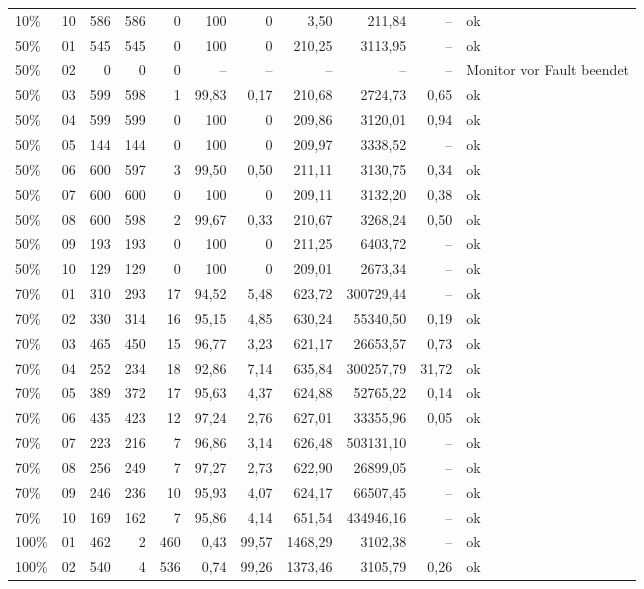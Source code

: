 \begin{longtable}{llrrrrrrrrl}
10\% & 10 & 586 & 586 & 0 & 100 & 0 & 3,50 & 211,84 & -- & ok \\
50\% & 01 & 545 & 545 & 0 & 100 & 0 & 210,25 & 3113,95 & -- & ok \\
50\% & 02 & 0 & 0 & 0 & -- & -- & -- & -- & -- & Monitor vor Fault beendet \\
50\% & 03 & 599 & 598 & 1 & 99,83 & 0,17 & 210,68 & 2724,73 & 0,65 & ok \\
50\% & 04 & 599 & 599 & 0 & 100 & 0 & 209,86 & 3120,01 & 0,94 & ok \\
50\% & 05 & 144 & 144 & 0 & 100 & 0 & 209,97 & 3338,52 & -- & ok \\
50\% & 06 & 600 & 597 & 3 & 99,50 & 0,50 & 211,11 & 3130,75 & 0,34 & ok \\
50\% & 07 & 600 & 600 & 0 & 100 & 0 & 209,11 & 3132,20 & 0,38 & ok \\
50\% & 08 & 600 & 598 & 2 & 99,67 & 0,33 & 210,67 & 3268,24 & 0,50 & ok \\
50\% & 09 & 193 & 193 & 0 & 100 & 0 & 211,25 & 6403,72 & -- & ok \\
50\% & 10 & 129 & 129 & 0 & 100 & 0 & 209,01 & 2673,34 & -- & ok \\
70\% & 01 & 310 & 293 & 17 & 94,52 & 5,48 & 623,72 & 300729,44 & -- & ok \\
70\% & 02 & 330 & 314 & 16 & 95,15 & 4,85 & 630,24 & 55340,50 & 0,19 & ok \\
70\% & 03 & 465 & 450 & 15 & 96,77 & 3,23 & 621,17 & 26653,57 & 0,73 & ok \\
70\% & 04 & 252 & 234 & 18 & 92,86 & 7,14 & 635,84 & 300257,79 & 31,72 & ok \\
70\% & 05 & 389 & 372 & 17 & 95,63 & 4,37 & 624,88 & 52765,22 & 0,14 & ok \\
70\% & 06 & 435 & 423 & 12 & 97,24 & 2,76 & 627,01 & 33355,96 & 0,05 & ok \\
70\% & 07 & 223 & 216 & 7 & 96,86 & 3,14 & 626,48 & 503131,10 & -- & ok \\
70\% & 08 & 256 & 249 & 7 & 97,27 & 2,73 & 622,90 & 26899,05 & -- & ok \\
70\% & 09 & 246 & 236 & 10 & 95,93 & 4,07 & 624,17 & 66507,45 & -- & ok \\
70\% & 10 & 169 & 162 & 7 & 95,86 & 4,14 & 651,54 & 434946,16 & -- & ok \\
100\% & 01 & 462 & 2 & 460 & 0,43 & 99,57 & 1468,29 & 3102,38 & -- & ok \\
100\% & 02 & 540 & 4 & 536 & 0,74 & 99,26 & 1373,46 & 3105,79 & 0,26 & ok \\

\end{longtable}
